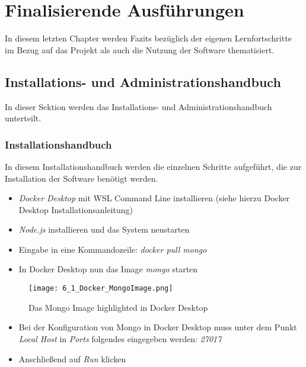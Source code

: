 \chapter{Finalisierende Ausführungen}

In diesem letzten Chapter werden Fazits bezüglich der eigenen Lernfortschritte im Bezug auf das Projekt als auch die Nutzung der Software thematisiert.

\section{Installations- und Administrationshandbuch}

In dieser Sektion werden das Installations- und Administrationshandbuch unterteilt.

\subsection{Installationshandbuch}

In diesem Installationshandbuch werden die einzelnen Schritte aufgeführt, die zur Installation der Software benötigt werden.

\begin{itemize}
    \item   \textit{Docker Desktop} mit WSL Command Line installieren (siehe hierzu Docker Desktop Installationsanleitung)
    \item   \textit{Node.js} installieren und das System neustarten
    \item   Eingabe in eine Kommandozeile: \textit{docker pull mongo}
    \item   In Docker Desktop nun das Image \textit{mongo} starten
\end{itemize}

\begin{figure}[!h]
    \centering
    \texttt{[image: 6\_1\_Docker\_MongoImage.png]}
    \caption{Das Mongo Image highlighted in Docker Desktop}
    \label{fig:DockerMongoImage}
\end{figure}

\begin{itemize}
    \item   Bei der Konfiguration von Mongo in Docker Desktop muss unter dem Punkt \textit{Local Host} in \textit{Ports} folgendes eingegeben werden: \textit{27017}
    \item   Anschließend auf \textit{Run} klicken 
\end{itemize}

